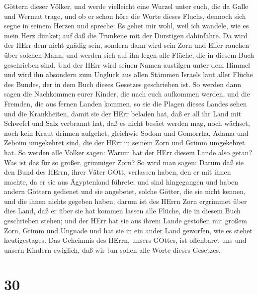Göttern dieser Völker, und werde vielleicht eine Wurzel unter euch, die
da Galle und Wermut trage,  und ob er schon höre die Worte
dieses Fluchs, dennoch sich segne in seinem Herzen und spreche: Es gehet
mir wohl, weil ich wandele, wie es mein Herz dünket; auf daß die
Trunkene mit der Durstigen dahinfahre.  Da wird der HErr
dem nicht gnädig sein, sondern dann wird sein Zorn und Eifer rauchen
über solchen Mann, und werden sich auf ihn legen alle Flüche, die in
diesem Buch geschrieben sind. Und der HErr wird seinen Namen austilgen
unter dem Himmel  und wird ihn absondern zum Unglück aus
allen Stämmen Israels laut aller Flüche des Bundes, der in dem Buch
dieses Gesetzes geschrieben ist.  So werden dann sagen die
Nachkommen eurer Kinder, die nach euch aufkommen werden, und die
Fremden, die aus fernen Landen kommen, so sie die Plagen dieses Landes
sehen und die Krankheiten, damit sie der HErr beladen hat, 
daß er all ihr Land mit Schwefel und Salz verbrannt hat, daß es nicht
besäet werden mag, noch wächset, noch kein Kraut drinnen aufgehet,
gleichwie Sodom und Gomorrha, Adama und Zeboim umgekehret sind, die der
HErr in seinem Zorn und Grimm umgekehret hat.  So werden
alle Völker sagen: Warum hat der HErr diesem Lande also getan? Was ist
das für so großer, grimmiger Zorn?  So wird man sagen:
Darum daß sie den Bund des HErrn, ihrer Väter GOtt, verlassen haben, den
er mit ihnen machte, da er sie aus Ägyptenland führete; 
und sind hingegangen und haben andern Göttern gedienet und sie
angebetet, solche Götter, die sie nicht kennen, und die ihnen nichts
gegeben haben;  darum ist des HErrn Zorn ergrimmet über
dies Land, daß er über sie hat kommen lassen alle Flüche, die in diesem
Buch geschrieben stehen;  und der HErr hat sie aus ihrem
Lande gestoßen mit großem Zorn, Grimm und Ungnade und hat sie in ein
ander Land geworfen, wie es stehet heutigestages.  Das
Geheimnis des HErrn, unsers GOttes, ist offenbaret uns und unsern
Kindern ewiglich, daß wir tun sollen alle Worte dieses Gesetzes.

\hypertarget{section-29}{%
\section{30}\label{section-29}}

